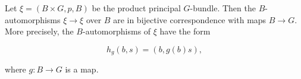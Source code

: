 Let $\xi = (B \times G, p, B)$ be the product principal $G$-bundle. Then the $B$-automorphisms $\xi \to \xi$ over $B$ are in bijective correspondence with maps $B \to G$. More precisely, the $B$-automorphisms of $\xi$ have the form

$$h_g(b, s) = (b, g(b)s),$$

where $g: B \to G$ is a map.
